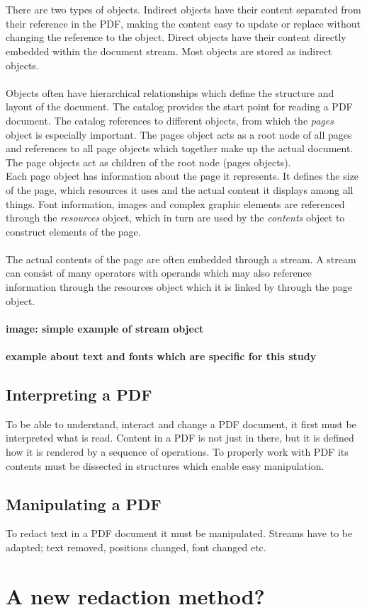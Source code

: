 \\\\
There are two types of objects. Indirect objects have their content separated from their reference in the PDF, making the content easy to update or replace without changing the reference to the object. Direct objects have their content directly embedded within the document stream. Most objects are stored as indirect objects. 
\\\\
Objects often have hierarchical relationships which define the structure and layout of the document. The catalog provides the start point for reading a PDF document. The catalog references to different objects, from which the \textit{pages} object is especially important. The pages object acts as a root node of all pages and references to all page objects which together make up the actual document. The page objects act as children of the root node (pages objects). \\
Each page object has information about the page it represents. It defines the size of the page, which resources it uses and the actual content it displays among all things. Font information, images and complex graphic elements are referenced through the \textit{resources} object, which in turn are used by the \textit{contents} object to construct elements of the page.
\\\\
The actual contents of the page are often embedded through a stream. A stream can consist of many operators with operands which may also reference information through the resources object which it is linked by through the page object.
\\\\
\textbf{image: simple example of stream object}
\\\\
\textbf{example about text and fonts which are specific for this study}

\subsection{Interpreting a PDF}
To be able to understand, interact and change a PDF document, it first must be interpreted what is read. Content in a PDF is not just in there, but it is defined how it is rendered by a sequence of operations. To properly work with PDF its contents must be dissected in structures which enable easy manipulation.

\subsection{Manipulating a PDF}
To redact text in a PDF document it must be manipulated. Streams have to be adapted; text removed, positions changed, font changed etc. 

\section{A new redaction method?}
